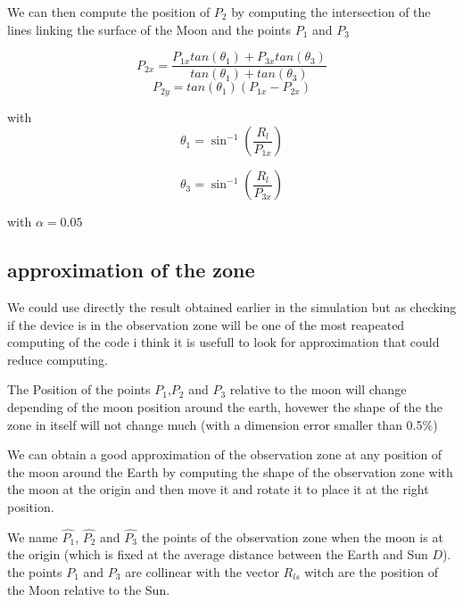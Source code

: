 \documentclass[11pt]{article} %
\begin{document}
		We can then compute the position of $P_2$ by computing the intersection of the lines linking the surface of the Moon and the points $P_1$ and $P_3$
		
		
		$$
		P_{2x}=\frac{P_{1x}tan(\theta_1) + P_{3x}tan(\theta_3)}{tan(\theta_1) + tan(\theta_3)}
		$$
		$$
		P_{2y}=tan(\theta_1)(P_{1x}-P_{2x})
		$$
		
		with
		$$
		\theta_1=\sin^{-1}\left(\frac{R_l}{P_{1x}}\right)
		$$
		
		$$
		\theta_3=\sin^{-1}\left(\frac{R_l}{P_{3x}}\right)
		$$
		
		with $\alpha=0.05$
		
		\subsection{approximation of the zone}
		
		We could use directly the result obtained earlier in the simulation but as checking if the device is in the observation zone will be one of the most reapeated computing of the code i think it is usefull to look for approximation that could reduce computing.
		
		The Position of the points $P_1$,$P_2$ and $P_3$ relative to the moon will change depending of the moon position around the earth, hovewer the shape of the the zone in itself will not change much (with a dimension error smaller than 0.5\%)
		
		
		We can obtain a good approximation of the observation zone at any position of the moon around the Earth by computing the shape of the observation zone with the moon at the origin and then move it and rotate it to place it at the right position.
		
		
		
		We name $\hat{P_1}$, $\hat{P_2}$ and $\hat{P_3}$ the points of the observation zone when the moon is at the origin (which is fixed at the average distance between the Earth and Sun $D$). the points $P_1$ and $P_3$ are collinear with the vector $R_{ls}$ witch are the position of the Moon relative to the Sun.
		
\end{document}
